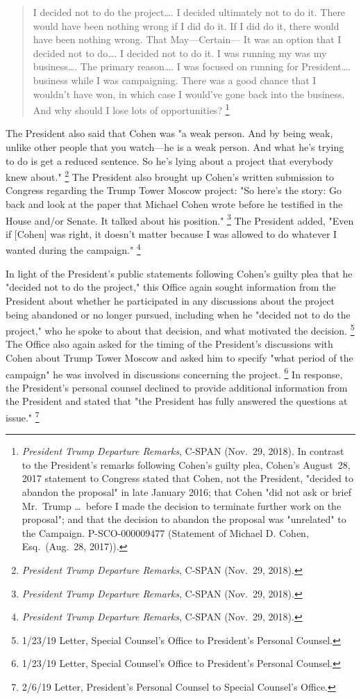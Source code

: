 \begin{quote}
I decided not to do the project\dots.
I decided ultimately not to do it.
There would have been nothing wrong if I did do it.
If I did do it, there would have been nothing wrong.
That
May---Certain---
It was an option that I decided not to do\dots.
I decided not to do it.
I was running my
was my business\dots.
The primary reason\dots.
I was focused on running for President\dots.
business while I was campaigning.
There was a good chance that I wouldn't have won, in which case I would've gone back into the business.
And why should I lose lots of opportunities?%
\footnote{\textit{President Trump Departure Remarks}, C-SPAN (Nov.~29, 2018).
In contrast to the President's remarks following Cohen's guilty plea, Cohen's August~28, 2017 statement to Congress stated that Cohen, not the President, "decided to abandon the proposal" in late January 2016;
that Cohen "did not ask or brief Mr.~Trump \dots\ before I made the decision to terminate further work on the proposal";
and that the decision to abandon the proposal was "unrelated" to the Campaign. P-SCO-000009477 (Statement of Michael D. Cohen, Esq.\ (Aug.~28, 2017)).
}
\end{quote}

The President also said that Cohen was "a weak person.
And by being weak, unlike other people that you watch---he is a weak person.
And what he's trying to do is get a reduced sentence.
So he's lying about a project that everybody knew about."%
\footnote{\textit{President Trump Departure Remarks}, C-SPAN (Nov.~29, 2018).}
The President also brought up Cohen's written submission to Congress regarding the Trump Tower Moscow project:
"So here's the story: Go back and look at the paper that Michael Cohen wrote before he testified in the House and/or Senate.
It talked about his position."%
\footnote{\textit{President Trump Departure Remarks}, C-SPAN (Nov.~29, 2018).}
The President added, "Even if [Cohen] was right, it doesn't matter because I was allowed to do whatever I wanted during the campaign."%
\footnote{\textit{President Trump Departure Remarks}, C-SPAN (Nov.~29, 2018).}

In light of the President's public statements following Cohen's guilty plea that he "decided not to do the project," this Office again sought information from the President about whether he participated in any discussions about the project being abandoned or no longer pursued, including when he "decided not to do the project," who he spoke to about that decision, and what motivated the decision.%
\footnote{1/23/19 Letter, Special Counsel's Office to President's Personal Counsel.}
The Office also again asked for the timing of the President's discussions with Cohen about Trump Tower Moscow and asked him to specify "what period of the campaign" he was involved in discussions concerning the project.%
\footnote{1/23/19 Letter, Special Counsel's Office to President's Personal Counsel.}
In response, the President's personal counsel declined to provide additional information from the President and stated that "the President has fully answered the questions at issue."%
\footnote{2/6/19 Letter, President's Personal Counsel to Special Counsel's Office.}

